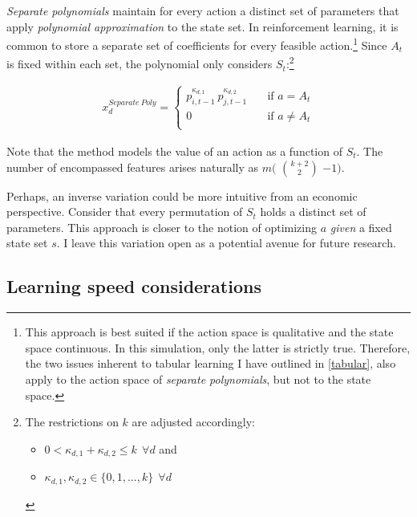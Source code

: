 \emph{Separate polynomials} maintain for every action a distinct set of parameters that apply \emph{polynomial approximation} to the state set. In reinforcement learning, it is common to store a separate set of coefficients for every feasible action.\footnote{This approach is best suited if the action space is qualitative and the state space continuous. In this simulation, only the latter is strictly true. Therefore, the two issues inherent to tabular learning I have outlined in \autoref{tabular}, also apply to the action space of \emph{separate polynomials}, but not to the state space.} Since $A_t$ is fixed within each set, the polynomial only considers $S_t$:\footnote{The restrictions on $k$ are adjusted accordingly:
	\begin{itemize}
		\item $0 < \kappa_{d,1} + \kappa_{d,2}  \leq k  ~~ \forall d$ and
		\item $\kappa_{d,1}, \kappa_{d,2} \in \{0, 1, ..., k\} ~~  \forall d$
	\end{itemize}
}


\begin{gather}\label{separated_poly_extraction}
x_d^{Separate~Poly} = \begin{cases}
p_{i, t-1}^{\kappa_{d,1}} ~ p_{j, t-1}^{\kappa_{d,2}} & \quad \text{if } a = A_t  \\
0 & \quad \text{if } a \ne A_t \\ \end{cases} 
\end{gather}

Note that the method models the value of an action as a function of $S_t$. The number of encompassed features arises naturally as $m($ $k+2\choose2$ $-1)$.


Perhaps, an inverse variation could be more intuitive from an economic perspective. Consider that every permutation of $S_t$ holds a distinct set of parameters. This approach is closer to the notion of optimizing $a$ \emph{given} a fixed state set $s$. I leave this variation open as a potential avenue for future research.

\subsection{Learning speed considerations}\label{learning_speed_considerations}

